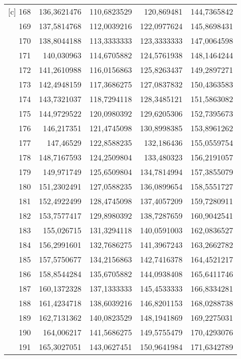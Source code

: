 \begin{longtable}{r|rrrr}[c]
    168   & 136,3621476 & 110,6823529 & 120,869481 & 144,7365842 \\
    169   & 137,5814768 & 112,0039216 & 122,0977624 & 145,8698431 \\
    170   & 138,8044188 & 113,3333333 & 123,3333333 & 147,0064598 \\
    171   & 140,030963 & 114,6705882 & 124,5761938 & 148,1464244 \\
    172   & 141,2610988 & 116,0156863 & 125,8263437 & 149,2897271 \\
    173   & 142,4948159 & 117,3686275 & 127,0837832 & 150,4363583 \\
    174   & 143,7321037 & 118,7294118 & 128,3485121 & 151,5863082 \\
    175   & 144,9729522 & 120,0980392 & 129,6205306 & 152,7395673 \\
    176   & 146,217351 & 121,4745098 & 130,8998385 & 153,8961262 \\
    177   & 147,46529 & 122,8588235 & 132,186436 & 155,0559754 \\
    178   & 148,7167593 & 124,2509804 & 133,480323 & 156,2191057 \\
    179   & 149,971749 & 125,6509804 & 134,7814994 & 157,3855079 \\
    180   & 151,2302491 & 127,0588235 & 136,0899654 & 158,5551727 \\
    181   & 152,4922499 & 128,4745098 & 137,4057209 & 159,7280911 \\
    182   & 153,7577417 & 129,8980392 & 138,7287659 & 160,9042541 \\
    183   & 155,026715 & 131,3294118 & 140,0591003 & 162,0836527 \\
    184   & 156,2991601 & 132,7686275 & 141,3967243 & 163,2662782 \\
    185   & 157,5750677 & 134,2156863 & 142,7416378 & 164,4521217 \\
    186   & 158,8544284 & 135,6705882 & 144,0938408 & 165,6411746 \\
    187   & 160,1372328 & 137,1333333 & 145,4533333 & 166,8334281 \\
    188   & 161,4234718 & 138,6039216 & 146,8201153 & 168,0288738 \\
    189   & 162,7131362 & 140,0823529 & 148,1941869 & 169,2275031 \\
    190   & 164,006217 & 141,5686275 & 149,5755479 & 170,4293076 \\
    191   & 165,3027051 & 143,0627451 & 150,9641984 & 171,6342789 \\

\end{longtable}
